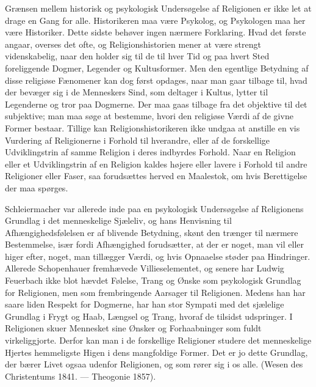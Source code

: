 \documentclass[12pt,a4paper,openany]{book}
\newcommand{\opage}[1]{\marginnote{\footnotesize\textit{[#1]}}}
\begin{document}
Grænsen mellem historisk og psykologisk Undersøgelse af Religionen
er ikke let at drage en Gang for alle. Historikeren maa være
Psykolog, og Psykologen maa her være Historiker. Dette sidste behøver
ingen nærmere Forklaring. Hvad det første angaar, overses
det ofte, og Religionshistorien mener at være strengt videnskabelig,
naar den holder sig til de til hver Tid og paa hvert Sted foreliggende
Dogmer, Legender og Kultusformer. Men den egentlige Betydning
af disse religiøse Fænomener kan dog først opdages, naar man gaar
tilbage til, hvad der bevæger sig i de Menneskers Sind, som deltager
i Kultus, lytter til Legenderne og tror paa Dogmerne. Der maa gaas
tilbage fra det objektive til det subjektive; man maa søge at bestemme,
hvori den religiøse Værdi af de givne Former bestaar. Tillige
kan Religionshistorikeren ikke undgaa at anstille en vis Vurdering
af Religionerne i Forhold til hverandre, eller af de forskellige
Udviklingstrin af samme Religion i deres indbyrdes Forhold. Naar
en Religion eller et Udviklingstrin af en Religion kaldes højere eller
lavere i Forhold til andre Religioner eller Faser, saa forudsættes
herved en Maalestok, om hvis Berettigelse der maa spørges.

\opage{133}Schleiermacher var allerede inde paa en psykologisk Undersøgelse
af Religionens Grundlag i det menneskelige Sjæleliv, og hans Henvisning
til Afhængighedsfølelsen er af blivende Betydning, skønt den
trænger til nærmere Bestemmelse, især fordi Afhængighed forudsætter,
at der er noget, man vil eller higer efter, noget, man tillægger
Værdi, og hvis Opnaaelse støder paa Hindringer. Allerede Schopenhauer
fremhævede Villieselementet, og senere har Ludwig Feuerbach
ikke blot hævdet Følelse, Trang og Ønske som psykologisk
Grundlag for Religionen, men som frembringende Aarsager til Religionen.
Medens han har saare liden Respekt for Dogmerne, har han
stor Sympati med det sjælelige Grundlag i Frygt og Haab, Længsel
og Trang, hvoraf de tilsidst udspringer. I Religionen skuer Mennesket
sine Ønsker og Forhaabninger som fuldt virkeliggjorte. Derfor
kan man i de forskellige Religioner studere det menneskelige Hjertes
hemmeligste Higen i dens mangfoldige Former. Det er jo dette
Grundlag, der bærer Livet ogsaa udenfor Religionen, og som rører
sig i os alle. (Wesen des Christentums 1841. --- Theogonie 1857).
\end{document}
